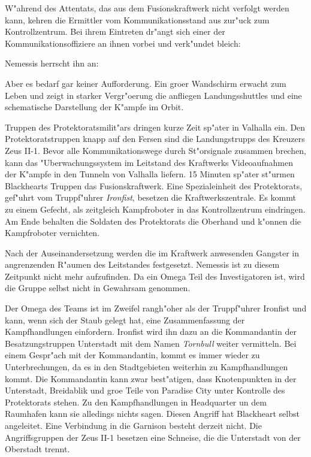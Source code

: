 
W"ahrend des Attentats, das aus dem Fusionskraftwerk nicht verfolgt werden kann, kehren die Ermittler vom Kommunikationsstand aus zur"uck zum Kontrollzentrum. Bei ihrem Eintreten dr"angt sich einer der Kommunikationsoffiziere an ihnen vorbei und verk"undet bleich:

 Nemessis herrscht ihn an: 

Aber es bedarf gar keiner Aufforderung. Ein gro\3er Wandschirm erwacht zum Leben und zeigt in starker Vergr"o\3erung die anfliegen Landungsshuttles und eine schematische Darstellung der K"ampfe im Orbit.

Truppen des Protektoratsmilit"ars dringen kurze Zeit sp"ater in Valhalla ein. Den Protektoratstruppen knapp auf den Fersen sind die Landungstrupps des Kreuzers Zeus II-1. Bevor alle Kommunikationswege durch St"orsignale zusammen brechen, kann das "Uberwachungssystem im Leitstand des Kraftwerks Videoaufnahmen der K"ampfe in den Tunneln von Valhalla liefern. 15 Minuten sp"ater st"urmen Blackhearts Truppen das Fusionskraftwerk. Eine Spezialeinheit des Protektorats, gef"uhrt vom Truppf"uhrer \emph{Ironfist}, besetzen die Kraftwerkszentrale. Es kommt zu einem Gefecht, als zeitgleich Kampfroboter in das Kontrollzentrum eindringen. Am Ende behalten die Soldaten des Protektorats die Oberhand und k"onnen die Kampfroboter vernichten. 

Nach der Auseinandersetzung werden die im Kraftwerk anwesenden Gangster in angrenzenden R"aumen des Leitstandes festgesetzt. Nemessis ist zu diesem Zeitpunkt nicht mehr aufzufinden. Da ein Omega Teil des Investigatoren ist, wird die Gruppe selbst nicht in Gewahrsam genommen. 

Der Omega des Teams ist im Zweifel rangh"oher als der Truppf"uhrer Ironfist und kann, wenn sich der Staub gelegt hat, eine Zusammenfassung der Kampfhandlungen einfordern. Ironfist wird ihn dazu an die Kommandantin der Besatzungstruppen Unterstadt mit dem Namen \emph{Tornbull} weiter vermitteln. Bei einem Gespr"ach mit der Kommandantin, kommt es immer wieder zu Unterbrechungen, da es in den Stadtgebieten weiterhin zu Kampfhandlungen kommt. Die Kommandantin kann zwar best"atigen, dass Knotenpunkten in der Unterstadt, Breidablik und gro\3e Teile von Paradise City unter Kontrolle des Protektorats stehen. Zu den Kampfhandlungen in Headquarter un dem Raumhafen kann sie alledings nichts sagen. Diesen Angriff hat Blackheart selbst angeleitet. Eine Verbindung in die Garnison besteht derzeit nicht. Die Angriffsgruppen der Zeus II-1 besetzen eine Schneise, die die Unterstadt von der Oberstadt trennt.


